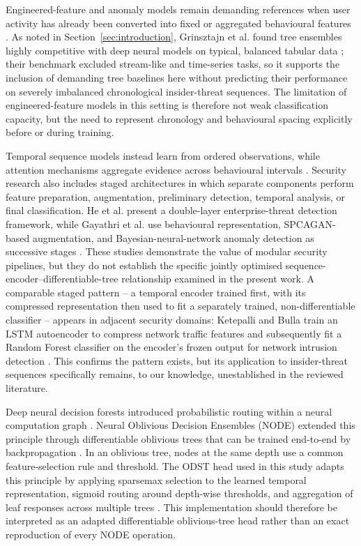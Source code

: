 Engineered-feature and anomaly models remain demanding references when user
activity has already been converted into fixed or aggregated behavioural
features \cite{AlMhiqani2022,Jaiswal2024,LeZincirHeywood2021}. As noted in
Section~\ref{sec:introduction}, Grinsztajn et al. found tree ensembles
highly competitive with deep neural models on typical, balanced tabular
data \cite{Grinsztajn2022}; their benchmark excluded stream-like and
time-series tasks, so it supports the inclusion of demanding tree
baselines here without predicting their performance on severely imbalanced
chronological insider-threat sequences. The limitation of engineered-feature
models in this setting is therefore not weak classification capacity, but
the need to represent chronology and behavioural spacing explicitly before
or during training.

\smallskip
Temporal sequence models instead learn from ordered observations, while
attention mechanisms aggregate evidence across behavioural intervals
\cite{YuanWu2021,Song2024,Pal2023}. Security research also includes staged
architectures in which separate components perform feature preparation,
augmentation, preliminary detection, temporal analysis, or final
classification. He et al. present a double-layer enterprise-threat
detection framework, while Gayathri et al. use behavioural representation,
SPCAGAN-based augmentation, and Bayesian-neural-network anomaly detection
as successive stages \cite{He2024,Gayathri2024}. These studies demonstrate
the value of modular security pipelines, but they do not establish the
specific jointly optimised sequence-encoder--differentiable-tree
relationship examined in the present work. A comparable staged pattern --
a temporal encoder trained first, with its compressed representation then
used to fit a separately trained, non-differentiable classifier -- appears
in adjacent security domains: Ketepalli and Bulla train an LSTM
autoencoder to compress network traffic features and subsequently fit a
Random Forest classifier on the encoder's frozen output for network
intrusion detection \cite{Ketepalli2022LSTMAE}. This confirms the pattern
exists, but its application to insider-threat sequences specifically
remains, to our knowledge, unestablished in the reviewed literature.

\smallskip
Deep neural decision forests introduced probabilistic routing within a
neural computation graph \cite{Kontschieder2015}. Neural Oblivious Decision
Ensembles (NODE) extended this principle through differentiable oblivious
trees that can be trained end-to-end by backpropagation
\cite{popov2020node}. In an oblivious tree, nodes at the same depth use a
common feature-selection rule and threshold. The ODST head used in this
study adapts this principle by applying sparsemax selection to the learned
temporal representation, sigmoid routing around depth-wise thresholds, and
aggregation of leaf responses across multiple trees
\cite{popov2020node,martins2016sparsemax}. This implementation should
therefore be interpreted as an adapted differentiable oblivious-tree head
rather than an exact reproduction of every NODE operation.


